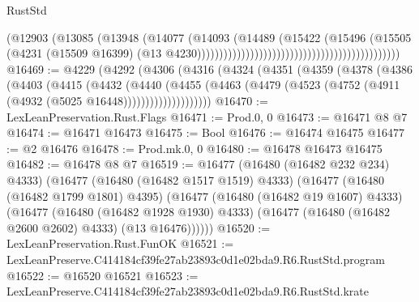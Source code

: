 \begin{lexlean}{RustStd}
\begin{coremodule}
                                                                          (@12903
                                                                            (@13085
                                                                              (@13948
                                                                                (@14077
                                                                                  (@14093
                                                                                    (@14489
                                                                                      (@15422
                                                                                        (@15496
                                                                                          (@15505
                                                                                            (@4231
                                                                                              (@15509
                                                                                                @16399)
                                                                                              (@13
                                                                                                @4230))))))))))))))))))))))))))))))))))))))))))))))
@16469 := @4229
    (@4292
      (@4306
        (@4316
          (@4324
            (@4351
              (@4359
                (@4378
                  (@4386
                    (@4403
                      (@4415
                        (@4432
                          (@4440
                            (@4455
                              (@4463
                                (@4479 (@4523 (@4752 (@4911 (@4932 (@5025 @16448))))))))))))))))))))
@16470 := LexLeanPreservation.Rust.Flags
@16471 := Prod.{0, 0}
@16473 := @16471 @8 @7
@16474 := @16471 @16473
@16475 := Bool
@16476 := @16474 @16475
@16477 := @2 @16476
@16478 := Prod.mk.{0, 0}
@16480 := @16478 @16473 @16475
@16482 := @16478 @8 @7
@16519 := @16477
    (@16480 (@16482 @232 @234) @4333)
    (@16477
      (@16480 (@16482 @1517 @1519) @4333)
      (@16477
        (@16480 (@16482 @1799 @1801) @4395)
        (@16477
          (@16480 (@16482 @19 @1607) @4333)
          (@16477
            (@16480 (@16482 @1928 @1930) @4333)
            (@16477 (@16480 (@16482 @2600 @2602) @4333) (@13 @16476))))))
@16520 := LexLeanPreservation.Rust.FunOK
@16521 := LexLeanPreserve.C414184cf39fe27ab23893c0d1e02bda9.R6.RustStd.program
@16522 := @16520 @16521
@16523 := LexLeanPreserve.C414184cf39fe27ab23893c0d1e02bda9.R6.RustStd.krate

\end{coremodule}
\end{lexlean}
